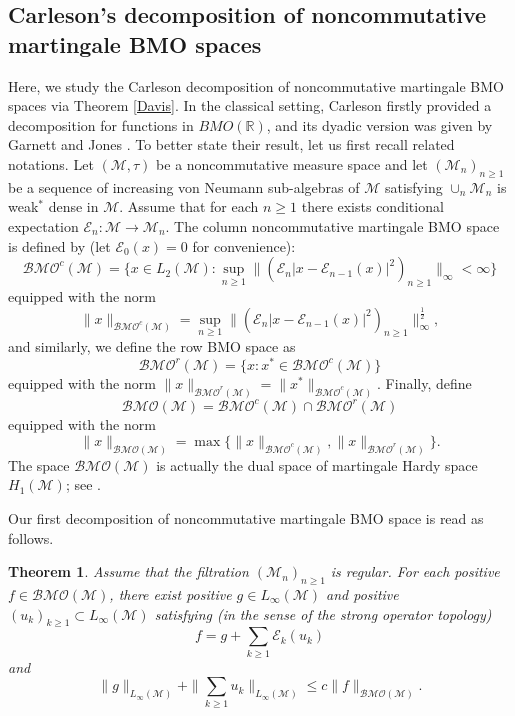 \documentclass[11]{amsart}
\numberwithin{equation}{section}
\newtheorem{theorem}{Theorem}[section]
\newcommand{\M}{\mathcal{M}}
\begin{document}
\subsection{Carleson's decomposition of noncommutative martingale BMO spaces}\label{sec-car-dyadic}
Here, we study the Carleson decomposition of noncommutative martingale BMO spaces via Theorem \ref{Davis}. In the classical setting, Carleson \cite{Ca1976} firstly provided a decomposition for functions in $BMO(\mathbb{R})$, and its dyadic version was given by Garnett and Jones \cite[Theorem 2.1]{GJ1982}. To better state their result, let us first recall related notations.  Let $(\mathcal{M},\tau)$ be a noncommutative measure space and let $(\mathcal{M}_n)_{n\geq1}$ be a sequence of  increasing von Neumann sub-algebras of $\mathcal{M}$ satisfying $\cup_n\mathcal{M}_n$ is weak$^*$ dense in $\mathcal{M}$.
Assume that for each $n\geq1$ there exists conditional expectation $\mathcal{E}_n:\mathcal{M}\to\mathcal{M}_n$. 
The column noncommutative martingale BMO space is  defined by (let $\mathcal{E}_0(x)=0$ for convenience):
$$\mathcal{BMO}^c(\mathcal{M})=\{x\in L_2(\mathcal{M}):\sup_{n\geq1} \|(\mathcal{E}_n|x-\mathcal{E}_{n-1}(x)|^2)_{n\geq1}\|_{\infty}<\infty\}$$
equipped with the norm 
$$\|x\|_{\mathcal{BMO}^c(\mathcal{M})}=\sup_{n\geq1}\|(\mathcal{E}_n|x-\mathcal{E}_{n-1}(x)|^2)_{n\geq1}\|_{\infty}^{\frac{1}{2}},$$
and similarly, we define  the row BMO space as 
$$\mathcal{BMO}^r(\mathcal{M})=\{x:x^*\in \mathcal{BMO}^c(\mathcal{M})\}$$
equipped with the norm 
$\|x\|_{\mathcal{BMO}^r(\mathcal{M})}=\|x^*\|_{\mathcal{BMO}^c(\mathcal{M})}.$ Finally, define 
$$\mathcal{BMO}(\mathcal{M})=\mathcal{BMO}^c(\mathcal{M})\cap \mathcal{BMO}^r(\mathcal{M})$$
equipped with the norm 
$$\|x\|_{\mathcal{BMO}(\mathcal{M})}=\max\{\|x\|_{\mathcal{BMO}^c(\mathcal{M})},\|x\|_{\mathcal{BMO}^r(\mathcal{M})}\}.$$
The space $\mathcal{BMO}(\mathcal{M})$ is actually the dual space of martingale Hardy space $H_1(\M)$; see \cite[Appendix]{PX1997}.



Our first decomposition of  noncommutative martingale BMO space is read as follows. 
\begin{theorem}\label{Ga decom}
Assume that the filtration $(\mathcal{M}_n)_{n\geq1}$ is regular. For each positive $f\in \mathcal{BMO}(\mathcal{M})$, there exist positive $g\in L_{\infty}(\mathcal{M})$ and positive $(u_k)_{k\geq1}\subset L_{\infty}(\mathcal{M})$ satisfying (in the sense of the strong operator topology)
$$f=g+\sum_{k\geq1}\mathcal{E}_k(u_k)$$
and 
$$\|g\|_{L_{\infty}(\mathcal{M})}+\|\sum_{k\geq1}u_k\|_{L_{\infty}(\mathcal{M})}\leq c\|f\|_{\mathcal{BMO}(\mathcal{M})}.$$
\end{theorem}
\end{document}
